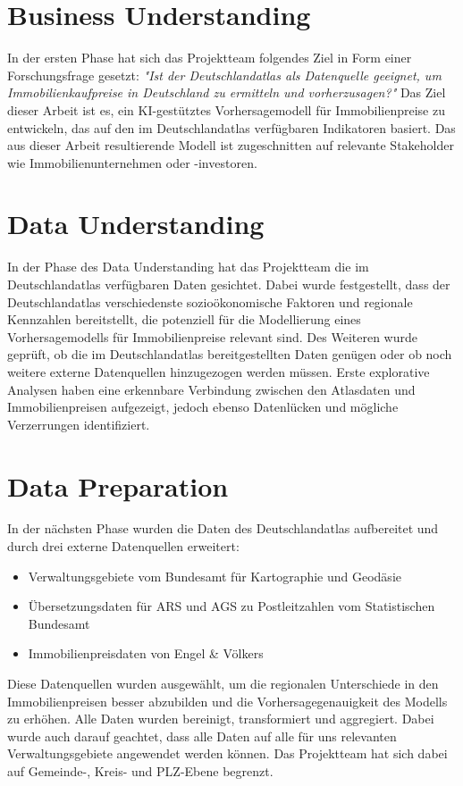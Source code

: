 \section*{Business Understanding}
In der ersten Phase hat sich das Projektteam folgendes Ziel in Form einer Forschungsfrage gesetzt: \textit{"Ist der Deutschlandatlas als Datenquelle geeignet, um Immobilienkaufpreise in Deutschland zu ermitteln und vorherzusagen?"}
Das Ziel dieser Arbeit ist es, ein KI-gestütztes Vorhersagemodell für Immobilienpreise zu entwickeln, das auf den im Deutschlandatlas verfügbaren Indikatoren basiert. Das aus dieser Arbeit resultierende Modell ist zugeschnitten auf relevante Stakeholder wie Immobilienunternehmen oder -investoren.

\section*{Data Understanding}
In der Phase des Data Understanding hat das Projektteam die im Deutschlandatlas verfügbaren Daten gesichtet. Dabei wurde festgestellt, dass der Deutschlandatlas verschiedenste sozioökonomische Faktoren und regionale Kennzahlen bereitstellt, die potenziell für die Modellierung eines Vorhersagemodells für Immobilienpreise relevant sind. Des Weiteren wurde geprüft, ob die im Deutschlandatlas bereitgestellten Daten genügen oder ob noch weitere externe Datenquellen hinzugezogen werden müssen. Erste explorative Analysen haben eine erkennbare Verbindung zwischen den Atlasdaten und Immobilienpreisen aufgezeigt, jedoch ebenso Datenlücken und mögliche Verzerrungen identifiziert.

\section*{Data Preparation}
In der nächsten Phase wurden die Daten des Deutschlandatlas aufbereitet und durch drei externe Datenquellen erweitert:
\begin{itemize}
    \item Verwaltungsgebiete vom Bundesamt für Kartographie und Geodäsie
    \item Übersetzungsdaten für ARS und AGS zu Postleitzahlen vom Statistischen Bundesamt
    \item Immobilienpreisdaten von Engel \& Völkers
\end{itemize}
Diese Datenquellen wurden ausgewählt, um die regionalen Unterschiede in den Immobilienpreisen besser abzubilden und die Vorhersagegenauigkeit des Modells zu erhöhen. Alle Daten wurden bereinigt, transformiert und aggregiert. Dabei wurde auch darauf geachtet, dass alle Daten auf alle für uns relevanten Verwaltungsgebiete angewendet werden können. Das Projektteam hat sich dabei auf Gemeinde-, Kreis- und PLZ-Ebene begrenzt.

